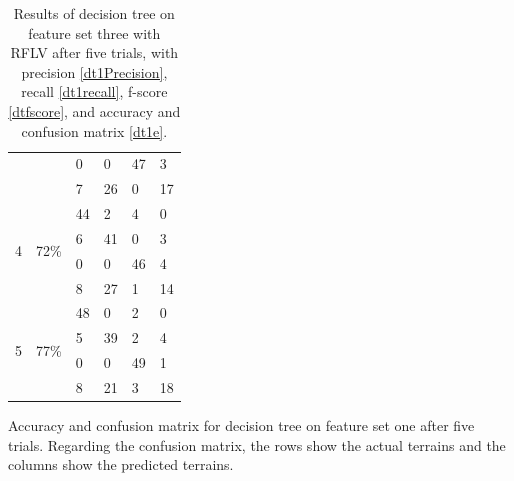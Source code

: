 \documentclass[USenglish]{ifimaster}  %
\begin{document}
\begin{table}[h]
\begin{subtable}[h]{1\textwidth}
\begin{tabular}{@{}llllll@{}}
		\multicolumn{1}{l|}{} & \multicolumn{1}{l|}{} & \multicolumn{1}{l|}{0} & \multicolumn{1}{l|}{0} & \multicolumn{1}{l|}{47} & 3 \\ \cmidrule(l){3-6} 
		\multicolumn{1}{l|}{} & \multicolumn{1}{l|}{} & \multicolumn{1}{l|}{7} & \multicolumn{1}{l|}{26} & \multicolumn{1}{l|}{0} & 17 \\ \midrule
		\multicolumn{1}{l|}{\multirow{4}{*}{4}} & \multicolumn{1}{l|}{\multirow{4}{*}{72\%}} & \multicolumn{1}{l|}{44} & \multicolumn{1}{l|}{2} & \multicolumn{1}{l|}{4} & 0 \\ \cmidrule(l){3-6} 
		\multicolumn{1}{l|}{} & \multicolumn{1}{l|}{} & \multicolumn{1}{l|}{6} & \multicolumn{1}{l|}{41} & \multicolumn{1}{l|}{0} & 3 \\ \cmidrule(l){3-6} 
		\multicolumn{1}{l|}{} & \multicolumn{1}{l|}{} & \multicolumn{1}{l|}{0} & \multicolumn{1}{l|}{0} & \multicolumn{1}{l|}{46} & 4 \\ \cmidrule(l){3-6} 
		\multicolumn{1}{l|}{} & \multicolumn{1}{l|}{} & \multicolumn{1}{l|}{8} & \multicolumn{1}{l|}{27} & \multicolumn{1}{l|}{1} & 14 \\ \midrule
		\multicolumn{1}{l|}{\multirow{4}{*}{5}} & \multicolumn{1}{l|}{\multirow{4}{*}{77\%}} & \multicolumn{1}{l|}{48} & \multicolumn{1}{l|}{0} & \multicolumn{1}{l|}{2} & 0 \\ \cmidrule(l){3-6} 
		\multicolumn{1}{l|}{} & \multicolumn{1}{l|}{} & \multicolumn{1}{l|}{5} & \multicolumn{1}{l|}{39} & \multicolumn{1}{l|}{2} & 4 \\ \cmidrule(l){3-6} 
		\multicolumn{1}{l|}{} & \multicolumn{1}{l|}{} & \multicolumn{1}{l|}{0} & \multicolumn{1}{l|}{0} & \multicolumn{1}{l|}{49} & 1 \\ \cmidrule(l){3-6} 
		\multicolumn{1}{l|}{} & \multicolumn{1}{l|}{} & \multicolumn{1}{l|}{8} & \multicolumn{1}{l|}{21} & \multicolumn{1}{l|}{3} & 18 \\ \bottomrule
	\end{tabular}
	\caption{Accuracy and confusion matrix for decision tree on feature set one after five trials. Regarding the confusion matrix, the rows show the actual terrains and the columns show the predicted terrains.}
	\label{dt1e}
	\end{subtable}
	\caption[Results of decision tree on feature set one with RFLV]{Results of decision tree on feature set three with RFLV after five trials, with precision \ref{dt1Precision}, recall \ref{dt1recall}, f-score \ref{dtfscore}, and accuracy and confusion matrix \ref{dt1e}.}
\label{tab:dta1ll}
\end{table}
\FloatBarrier
\newpage
\end{document}
